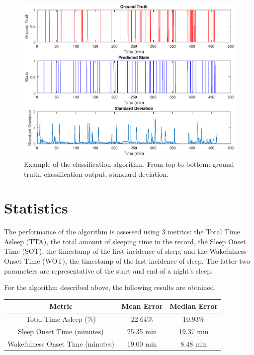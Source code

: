         \begin{figure}[h]
            \includegraphics[width=\textwidth]{Images/example_data_recording.eps}
            \centering
            \caption{Example of the classification algorithm. From top to bottom: ground truth, classification output, standard deviation.}
            \label{img_ex_data_recording}
        \end{figure}

        \section{Statistics}

            The performance of the algorithm is assessed using 3 metrics: the Total Time Asleep (TTA), the total amount of sleeping time in the record, the Sleep Onset Time (SOT), the timestamp of the first incidence of sleep, and the Wakefulness Onset Time (WOT), the timestamp of the last incidence of sleep. The latter two parameters are representative of the start and end of a night's sleep. 

            For the algorithm described above, the following results are obtained.

            \begin{center}
                \label{tbl_sleep_errors}
                \begin{tabular}{|c||c|c|}
                    \hline
                    Metric & Mean Error & Median Error \\
                    \hline
                    Total Time Asleep (\%) & 22.64\% & 10.93\% \\
                    Sleep Onset Time (minutes) & 25.35 min & 19.37 min \\
                    Wakefulness Onset Time (minutes) & 19.00 min & 8.48 min \\
                    \hline
                \end{tabular}
            \end{center}

